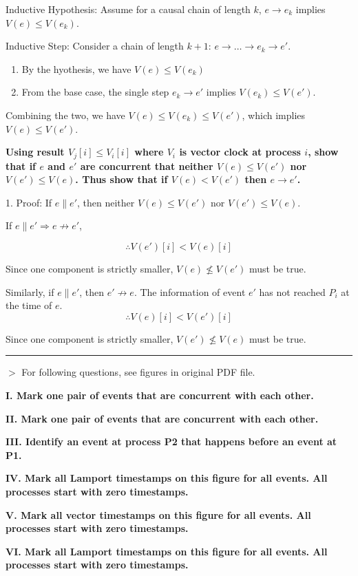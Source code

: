 \documentclass[12pt,a4paper]{article}
\newcommand{\remark}[1]{
    $>$ {\color{blue} #1}
}
\begin{document}
Inductive Hypothesis: Assume for a causal chain of length $k$, $e \to e_k$ implies $V(e) \le V(e_k)$.

Inductive Step: Consider a chain of length $k+1$: $e \to \dots \to e_k \to e'$.

\begin{enumerate}
    \item By the hyothesis, we have $V(e) \le V(e_k)$
    \item From the base case, the single step $e_k \to e'$ implies $V(e_k) \le V(e')$.
\end{enumerate}

Combining the two, we have $V(e) \le V(e_k) \le V(e')$, which implies $V(e) \le V(e')$.

\textbf{Using result $V_j[i] \le V_i[i]$ where $V_i$ is vector clock at process $i$, show that if $e$ and $e'$ are concurrent that neither $V(e) \le V(e')$ nor $V(e') \le V(e)$. Thus show that if $V(e) < V(e')$ then $e \to e'$.}

1. Proof: If $e \parallel e'$, then neither $V(e) \le V(e')$ nor $V(e') \le V(e)$.

If $e \parallel e' \Rightarrow e \not\to e'$,

\[\therefore V(e')[i] < V(e)[i]\]

Since one component is strictly smaller, $V(e) \not\le V(e')$ must be true.

Similarly, if $e \parallel e'$, then $e' \not\to e$. The information of event $e'$ has not reached $P_i$ at the time of $e$. 
\[\therefore V(e)[i] < V(e')[i]\]

Since one component is strictly smaller, $V(e') \not\le V(e)$ must be true.

\hrule

\remark{For following questions, see figures in original PDF file.}

\textbf{I. Mark one pair of events that are concurrent with each other.}

\textbf{II. Mark one pair of events that are concurrent with each other.}

\textbf{III. Identify an event at process P2 that happens before an event at P1.}

\textbf{IV. Mark all Lamport timestamps on this figure for all events. All processes start with zero timestamps.}

\textbf{V. Mark all vector timestamps on this figure for all events. All processes start with zero timestamps.}

\textbf{VI. Mark all Lamport timestamps on this figure for all events. All processes start with zero timestamps.}
\end{document}
